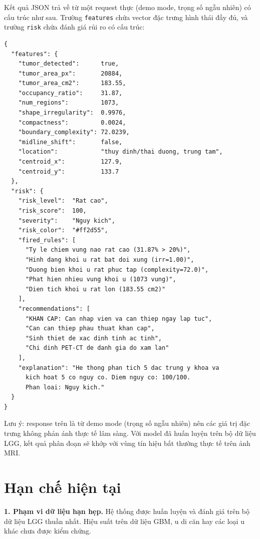 Kết quả JSON trả về từ một request thực (demo mode, trọng số ngẫu nhiên) có cấu trúc như sau. Trường \texttt{features} chứa vector đặc trưng hình thái đầy đủ, và trường \texttt{risk} chứa đánh giá rủi ro có cấu trúc:

\begin{lstlisting}[style=plaintext, caption={Vi du response JSON tu POST /api/v1/predict (truong base64 da luoc bo)}]
{
  "features": {
    "tumor_detected":      true,
    "tumor_area_px":       20884,
    "tumor_area_cm2":      183.55,
    "occupancy_ratio":     31.87,
    "num_regions":         1073,
    "shape_irregularity":  0.9976,
    "compactness":         0.0024,
    "boundary_complexity": 72.0239,
    "midline_shift":       false,
    "location":            "thuy dinh/thai duong, trung tam",
    "centroid_x":          127.9,
    "centroid_y":          133.7
  },
  "risk": {
    "risk_level":  "Rat cao",
    "risk_score":  100,
    "severity":    "Nguy kich",
    "risk_color":  "#ff2d55",
    "fired_rules": [
      "Ty le chiem vung nao rat cao (31.87% > 20%)",
      "Hinh dang khoi u rat bat doi xung (irr=1.00)",
      "Duong bien khoi u rat phuc tap (complexity=72.0)",
      "Phat hien nhieu vung khoi u (1073 vung)",
      "Dien tich khoi u rat lon (183.55 cm2)"
    ],
    "recommendations": [
      "KHAN CAP: Can nhap vien va can thiep ngay lap tuc",
      "Can can thiep phau thuat khan cap",
      "Sinh thiet de xac dinh tinh ac tinh",
      "Chi dinh PET-CT de danh gia do xam lan"
    ],
    "explanation": "He thong phan tich 5 dac trung y khoa va
      kich hoat 5 co nguy co. Diem nguy co: 100/100.
      Phan loai: Nguy kich."
  }
}
\end{lstlisting}

Lưu ý: response trên là từ demo mode (trọng số ngẫu nhiên) nên các giá trị đặc trưng không phản ánh thực tế lâm sàng. Với model đã huấn luyện trên bộ dữ liệu LGG, kết quả phân đoạn sẽ khớp với vùng tín hiệu bất thường thực tế trên ảnh MRI.



\section{Hạn chế hiện tại}

\textbf{1. Phạm vi dữ liệu hạn hẹp.}
Hệ thống được huấn luyện và đánh giá trên bộ dữ liệu LGG thuần nhất. Hiệu suất trên dữ liệu GBM, u di căn hay các loại u khác chưa được kiểm chứng.

